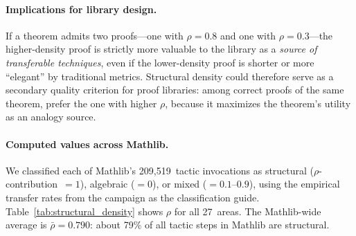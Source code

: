 \documentclass[11pt]{article}
\theoremstyle{definition}
\theoremstyle{remark}
\begin{document}
\paragraph{Implications for library design.}
If a theorem admits two proofs---one with $\rho = 0.8$ and one with
$\rho = 0.3$---the higher-density proof is strictly more valuable
to the library as a \emph{source of transferable techniques}, even
if the lower-density proof is shorter or more ``elegant'' by
traditional metrics.  Structural density could therefore serve as
a secondary quality criterion for proof libraries: among correct
proofs of the same theorem, prefer the one with higher $\rho$,
because it maximizes the theorem's utility as an analogy source.

\paragraph{Computed values across Mathlib.}
We classified each of Mathlib's 209{,}519~tactic invocations as
structural ($\rho$-contribution~$= 1$), algebraic ($= 0$), or
mixed ($= 0.1$--$0.9$), using the empirical transfer rates from
the campaign as the classification guide.
Table~\ref{tab:structural_density} shows $\rho$ for all
27~areas.  The Mathlib-wide average is
$\bar{\rho} = 0.790$: about 79\% of all tactic steps in
Mathlib are structural.
\end{document}
